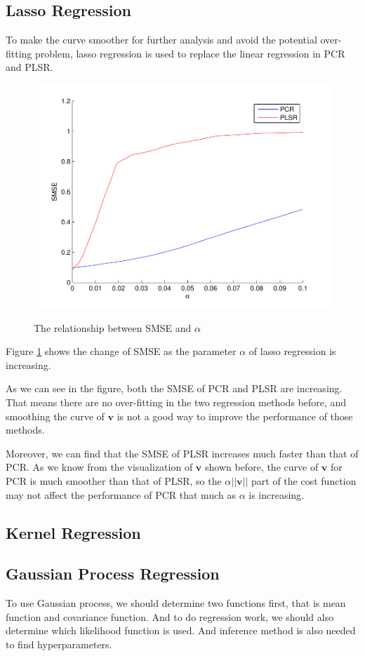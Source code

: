 \documentclass[a4paper]{article}
\newcommand{\bfv}{\mathbf{v}}
\begin{document}
\subsection{Lasso Regression}
To make the curve smoother for further analysis and avoid the potential over-fitting problem, lasso regression is used to replace the linear regression in PCR and PLSR.
\begin{figure}[h]
  \centering
  \includegraphics[width=.6\textwidth]{images/lasso.pdf}\\
  \caption{The relationship between SMSE and $\alpha$}\label{pic8}
\end{figure}

Figure \ref{pic8} shows the change of SMSE as the parameter $\alpha$ of lasso regression is increasing. 

As we can see in the figure, both the SMSE of PCR and PLSR are increasing. That means there are no over-fitting in the two regression methods before, and smoothing the curve of $\bfv$ is not a good way to improve the performance of those methods.

Moreover, we can find that the SMSE of PLSR increases much faster than that of PCR. As we know from the visualization of $\bfv$ shown before, the curve of $\bfv$ for PCR is much smoother than that of PLSR, so the $\alpha ||\bfv||$ part of the cost function may not affect the performance of PCR that much as $\alpha$ is increasing.
\subsection{Kernel Regression}

\subsection{Gaussian Process Regression}
To use Gaussian process, we should determine two functions first, that is mean function and covariance function. And to do regression work, we should also determine which likelihood function is used. And inference method is also needed to find hyperparameters.
\end{document}
